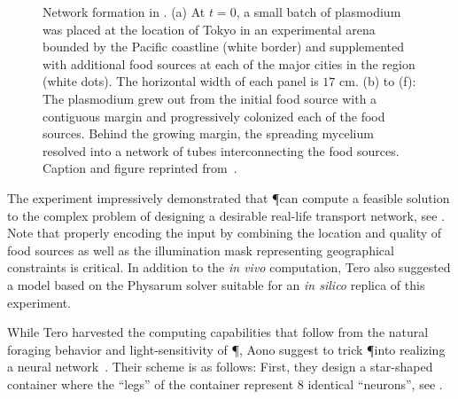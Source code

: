 			\begin{figure}
				\centering
				\newline
				
				
				\caption[Tokyo railway experiment]{Network formation in \Pp. (a) At $t = 0$, a small batch of plasmodium was placed at the location of Tokyo in an experimental arena bounded by the Pacific coastline (white border) and supplemented with additional food sources at each of the major cities in the region (white dots). The horizontal width of each panel is $17$ cm. (b) to (f): The plasmodium grew out from the initial food source with a contiguous margin and progressively colonized each of the food sources. Behind the growing margin, the spreading mycelium resolved into a network of tubes interconnecting the food sources. Caption and figure reprinted from~\cite{tero2010rules}.}
				\label{fig:tokyo}
			\end{figure}

			The experiment impressively demonstrated that \P can compute a feasible solution to the complex problem of designing a desirable real-life transport network, see . Note that properly encoding the input by combining the location and quality of food sources as well as the illumination mask representing geographical constraints is critical. In addition to the \textit{in vivo} computation, Tero \etal also suggested a model based on the Physarum solver suitable for an \emph{in silico} replica of this experiment.

			\FloatBarrier

			While Tero \etal harvested the computing capabilities that follow from the natural foraging behavior and light-sensitivity of \P, Aono \etal suggest to trick \P into realizing a neural network~\cite{Aono:2007:ANC:1284621.1284651,Aono2009,Aono2007,Aono200883}. Their scheme is as follows: First, they design a star-shaped container where the ``legs'' of the container represent $8$ identical ``neurons'', see . 

